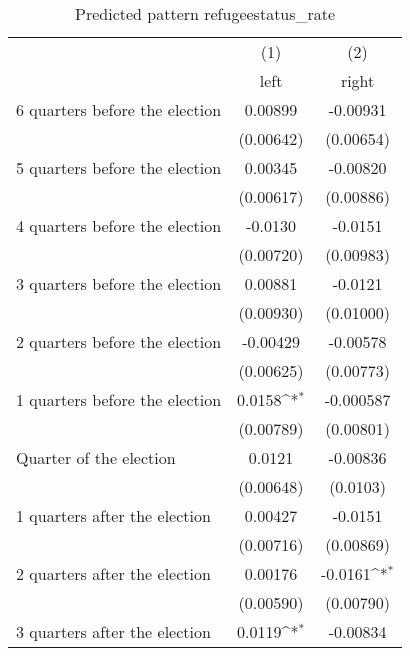 \begin{table}[htbp]\centering
\def\sym#1{\ifmmode^{#1}\else\(^{#1}\)\fi}
\caption{Predicted pattern refugeestatus\_rate}
\begin{tabular}{l*{2}{c}}
\hline\hline
                    &\multicolumn{1}{c}{(1)}&\multicolumn{1}{c}{(2)}\\
                    &\multicolumn{1}{c}{left}&\multicolumn{1}{c}{right}\\
\hline
 6 quarters before the election&     0.00899         &    -0.00931         \\
                    &   (0.00642)         &   (0.00654)         \\
[1em]
 5 quarters before the election&     0.00345         &    -0.00820         \\
                    &   (0.00617)         &   (0.00886)         \\
[1em]
 4 quarters before the election&     -0.0130         &     -0.0151         \\
                    &   (0.00720)         &   (0.00983)         \\
[1em]
 3 quarters before the election&     0.00881         &     -0.0121         \\
                    &   (0.00930)         &   (0.01000)         \\
[1em]
 2 quarters before the election&    -0.00429         &    -0.00578         \\
                    &   (0.00625)         &   (0.00773)         \\
[1em]
 1 quarters before the election&      0.0158\sym{*}  &   -0.000587         \\
                    &   (0.00789)         &   (0.00801)         \\
[1em]
Quarter of the election&      0.0121         &    -0.00836         \\
                    &   (0.00648)         &    (0.0103)         \\
[1em]
 1 quarters after the election&     0.00427         &     -0.0151         \\
                    &   (0.00716)         &   (0.00869)         \\
[1em]
 2 quarters after the election&     0.00176         &     -0.0161\sym{*}  \\
                    &   (0.00590)         &   (0.00790)         \\
[1em]
 3 quarters after the election&      0.0119\sym{*}  &    -0.00834         \\

\end{tabular}
\end{table}
